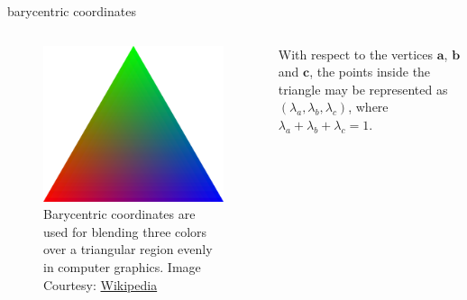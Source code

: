 \documentclass[aspectratio=169,xcolor={dvipsnames,svgnames}]{beamer}
\begin{document}
\begin{frame}[label={sec:org0c3ab12}]{barycentric coordinates}
\begin{columns}
\begin{column}{.3\columnwidth}
\begin{figure}[htbp]
\centering
\includegraphics[width=.9\linewidth]{images/Barycentric_RGB.svg.png}
\caption{Barycentric coordinates are used for blending three colors over a triangular region evenly in computer graphics. Image Courtesy: \href{https://commons.wikimedia.org/wiki/File:Barycentric\_RGB.svg}{Wikipedia}}
\end{figure}
\end{column}

\begin{column}{.5\columnwidth}
With respect to the vertices \(\mathbf{a}\), \(\mathbf{b}\)
and \(\mathbf{c}\), the points inside the triangle may be
represented as \((\lambda_{a},\lambda_{b},\lambda_{c})\),
where \(\lambda_{a} + \lambda_{b} + \lambda_{c} = 1\).
\end{column}
\end{columns}
\end{frame}
\end{document}

